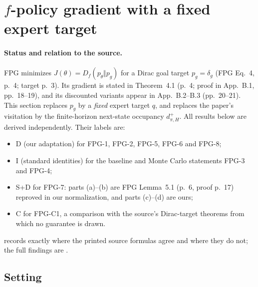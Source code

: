\section{\texorpdfstring{$f$}{f}-policy gradient with a fixed expert target}\label{sec:fpg}

\paragraph{Status and relation to the source.}
FPG minimizes $J(\theta)=D_f(p_\theta\Vert p_g)$ for a Dirac goal target $p_g=\delta_g$ (FPG Eq.~4, p.~4; target p.~3).
Its gradient is stated in Theorem~4.1 (p.~4; proof in App.~B.1, pp.~18--19), and its discounted variants appear in App.~B.2--B.3 (pp.~20--21).
This section replaces $p_g$ by a \emph{fixed} expert target $q$, and replaces the paper's visitation by the finite-horizon next-state occupancy $d^+_{\pi,H}$.
All results below are derived independently. Their labels are:
\begin{itemize}[nosep]
\item \textsf{D} (our adaptation) for FPG-1, FPG-2, FPG-5, FPG-6 and FPG-8;
\item \textsf{I} (standard identities) for the baseline and Monte Carlo statements FPG-3 and FPG-4;
\item \textsf{S+D} for FPG-7: parts (a)--(b) are FPG Lemma~5.1 (p.~6, proof p.~17) reproved in our normalization, and parts (c)--(d) are ours;
\item \textsf{C} for FPG-C1, a comparison with the source's Dirac-target theorems from which no guarantee is drawn.
\end{itemize}
 records exactly where the printed source formulas agree and where they do not; the full findings are .

\subsection{Setting}

